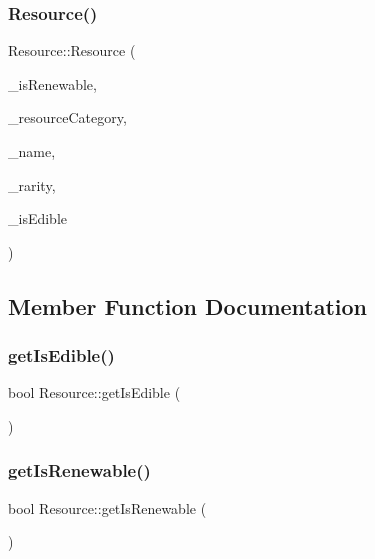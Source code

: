 \subsubsection{\texorpdfstring{Resource()}{Resource()}\hspace{0.1cm}{\footnotesize\ttfamily [3/3]}}
{\footnotesize\ttfamily Resource\+::\+Resource (\begin{DoxyParamCaption}\item[{bool}]{\+\_\+is\+Renewable,  }\item[{\mbox{\hyperlink{_resource_8hpp_abde177ff256dcb25ea4a492ad7335b82}{En\+Resource\+Category}}}]{\+\_\+resource\+Category,  }\item[{std\+::string}]{\+\_\+name,  }\item[{float}]{\+\_\+rarity,  }\item[{bool}]{\+\_\+is\+Edible }\end{DoxyParamCaption})}



\subsection{Member Function Documentation}
\mbox{\label{class_resource_a5cca32bbe54dd0b45266225b6685c95b}} 
\subsubsection{\texorpdfstring{get\+Is\+Edible()}{getIsEdible()}}
{\footnotesize\ttfamily bool Resource\+::get\+Is\+Edible (\begin{DoxyParamCaption}{ }\end{DoxyParamCaption})}

\mbox{\label{class_resource_a268644c83ddc06f22cd8877be98ebaaf}} 
\subsubsection{\texorpdfstring{get\+Is\+Renewable()}{getIsRenewable()}}
{\footnotesize\ttfamily bool Resource\+::get\+Is\+Renewable (\begin{DoxyParamCaption}{ }\end{DoxyParamCaption})}

